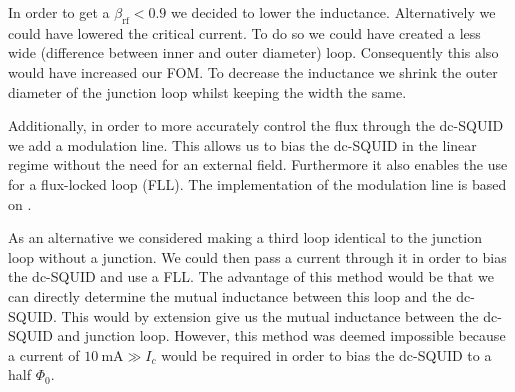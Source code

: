 In order to get a $\beta_{\text{rf}} < 0.9$ we decided to lower the inductance. Alternatively we could have lowered the critical current. To do so we could have created a less wide (difference between inner and outer diameter) loop. Consequently this also would have increased our FOM. To decrease the inductance we shrink the outer diameter of the junction loop whilst keeping the width the same.

Additionally, in order to more accurately control the flux through the dc-SQUID we add a modulation line. This allows us to bias the dc-SQUID in the linear regime without the need for an external field. Furthermore it also enables the use for a flux-locked loop (FLL). The implementation of the modulation line is based on \cite{linYBaCuNano2020}.

As an alternative we considered making a third loop identical to the junction loop without a junction. We could then pass a current through it in order to bias the dc-SQUID and use a FLL. The advantage of this method would be that we can directly determine the mutual inductance between this loop and the dc-SQUID. This would by extension give us the mutual inductance between the dc-SQUID and junction loop. However, this method was deemed impossible because a current of $\qty{10}{\milli\ampere} \gg I_c$ would be required in order to bias the dc-SQUID to a half $\Phi_0$.

